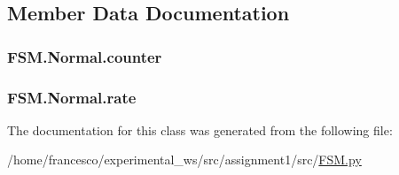\subsection{Member Data Documentation}
\subsubsection[{\texorpdfstring{counter}{counter}}]{\setlength{\rightskip}{0pt plus 5cm}F\+S\+M.\+Normal.\+counter}\hypertarget{classFSM_1_1Normal_aeeb78ed66cc617acb7ac428aa2507b6d}{}\label{classFSM_1_1Normal_aeeb78ed66cc617acb7ac428aa2507b6d}
\subsubsection[{\texorpdfstring{rate}{rate}}]{\setlength{\rightskip}{0pt plus 5cm}F\+S\+M.\+Normal.\+rate}\hypertarget{classFSM_1_1Normal_a99ce5b8dddfae4e6a49f4c1d292b5d83}{}\label{classFSM_1_1Normal_a99ce5b8dddfae4e6a49f4c1d292b5d83}


The documentation for this class was generated from the following file\+:\begin{DoxyCompactItemize}
\item 
/home/francesco/experimental\+\_\+ws/src/assignment1/src/\hyperlink{FSM_8py}{F\+S\+M.\+py}\end{DoxyCompactItemize}
